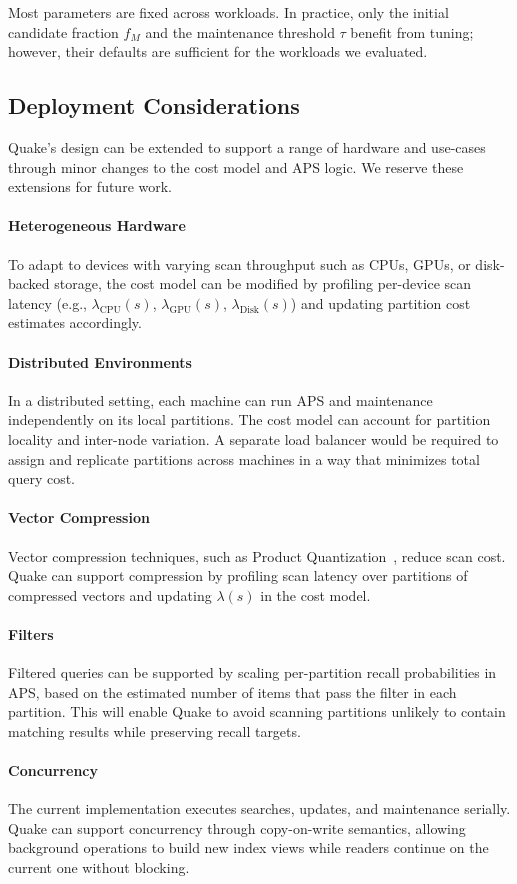 Most parameters are fixed across workloads. In practice, only the initial candidate fraction $f_M$ and the maintenance threshold $\tau$ benefit from tuning; however, their defaults are sufficient for the workloads we evaluated.

\subsection{Deployment Considerations}
Quake’s design can be extended to support a range of hardware and use-cases through minor changes to the cost model and APS logic. We reserve these extensions for future work.

\paragraph{Heterogeneous Hardware} To adapt to devices with varying scan throughput such as CPUs, GPUs, or disk-backed storage, the cost model can be modified by profiling per-device scan latency (e.g., $\lambda_{\text{CPU}}(s)$, $\lambda_{\text{GPU}}(s)$, $\lambda_{\text{Disk}}(s)$) and updating partition cost estimates accordingly.

\paragraph{Distributed Environments} In a distributed setting, each machine can run APS and maintenance independently on its local partitions. The cost model can account for partition locality and inter-node variation. A separate load balancer would be required to assign and replicate partitions across machines in a way that minimizes total query cost.

\paragraph{Vector Compression} Vector compression techniques, such as Product Quantization~\cite{jegou_product_2011}, reduce scan cost. Quake can support compression by profiling scan latency over partitions of compressed vectors and updating $\lambda(s)$ in the cost model.

\paragraph{Filters} Filtered queries can be supported by scaling per-partition recall probabilities in APS, based on the estimated number of items that pass the filter in each partition. This will enable Quake to avoid scanning partitions unlikely to contain matching results while preserving recall targets.

\paragraph{Concurrency} The current implementation executes searches, updates, and maintenance serially. Quake can support concurrency through copy-on-write semantics, allowing background operations to build new index views while readers continue on the current one without blocking.